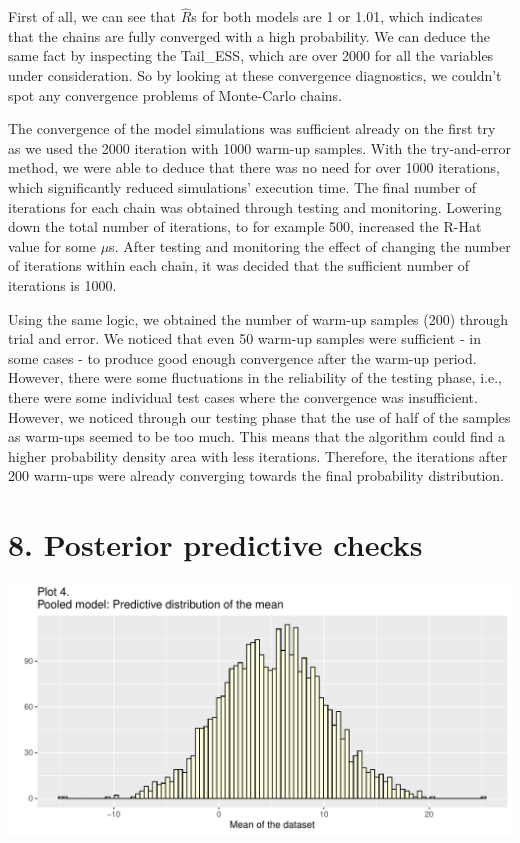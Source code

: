 \documentclass[
]{article}
\begin{document}
First of all, we can see that \(\hat{R}\)s for both models are 1 or
1.01, which indicates that the chains are fully converged with a high
probability. We can deduce the same fact by inspecting the Tail\_ESS,
which are over 2000 for all the variables under consideration. So by
looking at these convergence diagnostics, we couldn't spot any
convergence problems of Monte-Carlo chains.

The convergence of the model simulations was sufficient already on the
first try as we used the 2000 iteration with 1000 warm-up samples. With
the try-and-error method, we were able to deduce that there was no need
for over 1000 iterations, which significantly reduced simulations'
execution time. The final number of iterations for each chain was
obtained through testing and monitoring. Lowering down the total number
of iterations, to for example 500, increased the R-Hat value for some
\(\mu\)s. After testing and monitoring the effect of changing the number
of iterations within each chain, it was decided that the sufficient
number of iterations is 1000.

Using the same logic, we obtained the number of warm-up samples (200)
through trial and error. We noticed that even 50 warm-up samples were
sufficient - in some cases - to produce good enough convergence after
the warm-up period. However, there were some fluctuations in the
reliability of the testing phase, i.e., there were some individual test
cases where the convergence was insufficient. However, we noticed
through our testing phase that the use of half of the samples as
warm-ups seemed to be too much. This means that the algorithm could find
a higher probability density area with less iterations. Therefore, the
iterations after 200 warm-ups were already converging towards the final
probability distribution.

\hypertarget{posterior-predictive-checks}{%
\section{8. Posterior predictive
checks}\label{posterior-predictive-checks}}

\begin{center}\includegraphics{project_files/figure-latex/fig2-1} \end{center}
\end{document}

